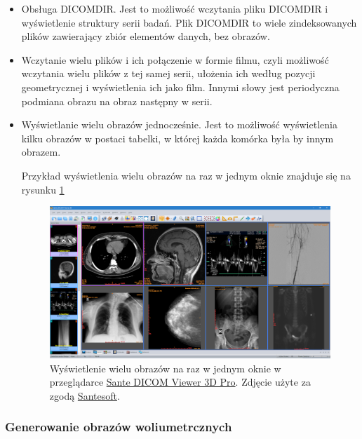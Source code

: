 \begin{itemize}

    \item Obsługa DICOMDIR.
          Jest to możliwość wczytania pliku DICOMDIR i wyświetlenie struktury serii badań.
          Plik DICOMDIR to wiele zindeksowanych plików zawierający zbiór elementów danych, bez obrazów.

    \item Wczytanie wielu plików i ich połączenie w formie filmu, czyli możliwość wczytania wielu plików z tej samej serii, ułożenia ich według pozycji geometrycznej i wyświetlenia ich jako film.
          Innymi słowy jest periodyczna podmiana obrazu na obraz następny w serii.

    \item Wyświetlanie wielu obrazów jednocześnie.
          Jest to możliwość wyświetlenia kilku obrazów w postaci tabelki, w której każda komórka była by innym obrazem.

          Przykład wyświetlenia wielu obrazów na raz w jednym oknie znajduje się na rysunku \ref{fig:dicomviewer001}

          \begin{figure}[!htbp]
              \centering
              \includegraphics[width=\textwidth]{img/dicom-viewer-001.png}
              \caption{Wyświetlenie wielu obrazów na raz w jednym oknie w przeglądarce \href{https://www.santesoft.com/win/sante-dicom-viewer-3d-pro/sante-dicom-viewer-3d-pro.html}{Sante DICOM Viewer 3D Pro}. Zdjęcie użyte za zgodą \href{https://www.santesoft.com/}{Santesoft}.}
              \label{fig:dicomviewer001}
          \end{figure}
\end{itemize}

\subsubsection{Generowanie obrazów woliumetrcznych}

